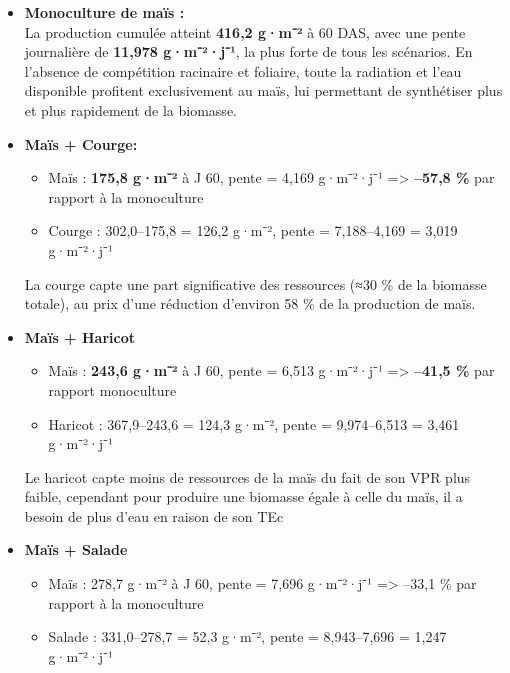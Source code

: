 \documentclass[
]{article}
\begin{document}
\begin{itemize}
\item
  \textbf{Monoculture de maïs :\\
  }La production cumulée atteint \textbf{416,2 g·m⁻²} à 60 DAS, avec une
  pente journalière de \textbf{11,978 g·m⁻²·j⁻¹}, la plus forte de tous
  les scénarios. En l'absence de compétition racinaire et foliaire,
  toute la radiation et l'eau disponible profitent exclusivement au
  maïs, lui permettant de synthétiser plus et plus rapidement de la
  biomasse.
\item
  \textbf{Maïs + Courge:}

  \begin{itemize}
  \item
    Maïs : \textbf{175,8 g·m⁻²} à J 60, pente = 4,169 g·m⁻²·j⁻¹
    =\textgreater{} \textbf{--57,8 \%} par rapport à la monoculture
  \item
    Courge : 302,0--175,8 = 126,2 g·m⁻², pente = 7,188--4,169 = 3,019
    g·m⁻²·j⁻¹
  \end{itemize}

  La courge capte une part significative des ressources (≈30 \% de la
  biomasse totale), au prix d'une réduction d'environ 58 \% de la
  production de maïs.
\item
  \textbf{Maïs + Haricot}

  \begin{itemize}
  \item
    Maïs : \textbf{243,6 g·m⁻²} à J 60, pente = 6,513 g·m⁻²·j⁻¹
    =\textgreater{} \textbf{--41,5 \%} par rapport monoculture
  \item
    Haricot : 367,9--243,6 = 124,3 g·m⁻², pente = 9,974--6,513 = 3,461
    g·m⁻²·j⁻¹
  \end{itemize}

  Le haricot capte moins de ressources de la maïs du fait de son VPR
  plus faible, cependant pour produire une biomasse égale à celle du
  maïs, il a besoin de plus d'eau en raison de son TEc
\item
  \textbf{Maïs + Salade}

  \begin{itemize}
  \item
    Maïs : 278,7 g·m⁻² à J 60, pente = 7,696 g·m⁻²·j⁻¹ =\textgreater{}
    --33,1 \% par rapport à la monoculture
  \item
    Salade : 331,0--278,7 = 52,3 g·m⁻², pente = 8,943--7,696 = 1,247
    g·m⁻²·j⁻¹
  \end{itemize}
\end{itemize}
\end{document}
